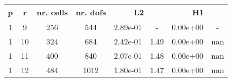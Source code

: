 \documentclass[10pt]{report}
\begin{document}
\begin{table}[H]
\begin{center}
\begin{tabular}{|c|c|c|c|c|c|c|c|} \hline
p & r & nr. cells & nr. dofs & 
\multicolumn{2}{|c|}{L2} & 
\multicolumn{2}{|c|}{H1}\\ \hline
1 & 9 & 256 & 544 & 2.89e-01 & - & 0.00e+00 & -\\ \hline
1 & 10 & 324 & 684 & 2.42e-01 & 1.49 & 0.00e+00 & nan\\ \hline
1 & 11 & 400 & 840 & 2.07e-01 & 1.48 & 0.00e+00 & nan\\ \hline
1 & 12 & 484 & 1012 & 1.80e-01 & 1.47 & 0.00e+00 & nan\\ \hline
\end{tabular}
\end{center}
\end{table}
\end{document}
